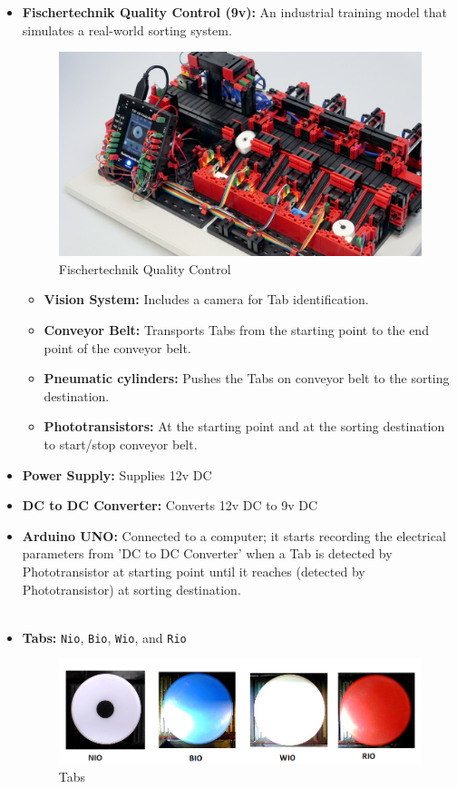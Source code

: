 \documentclass{article}
\begin{document}
\begin{itemize}
  \item \textbf{Fischertechnik Quality Control (9v):} An industrial training model that simulates a real-world sorting system.
    \begin{figure}[h]
        \centering
        \includegraphics[width=0.4\linewidth]{quality_control.jpeg}
        \caption{Fischertechnik Quality Control}
        \label{fig:labels}
    \end{figure}



  
    \begin{itemize}
          \item \textbf{Vision System:} Includes a camera for Tab identification.
          \item \textbf{Conveyor Belt:} Transports Tabs from the starting point to the end point of the conveyor belt.
          \item \textbf{Pneumatic cylinders:} Pushes the Tabs on conveyor belt to the sorting destination.
          \item \textbf{Phototransistors:} At the starting point and at the sorting destination to start/stop conveyor belt.
    \end{itemize}
  \item \textbf{Power Supply:} Supplies 12v DC
  \item \textbf{DC to DC Converter:} Converts 12v DC to 9v DC
  \item \textbf{Arduino UNO:} Connected to a computer; it starts recording the electrical parameters from 'DC to DC Converter' when a Tab is detected by Phototransistor at starting point until it reaches (detected by Phototransistor) at sorting destination.
  \\
  \vspace{0.8cm}
  \\
  \item \textbf{Tabs:} \texttt{Nio}, \texttt{Bio}, \texttt{Wio}, and \texttt{Rio}
    \begin{figure}[h]
        \centering
        \includegraphics[width=1\linewidth]{objects.png}
        \caption{Tabs}
        \label{fig:labels}
    \end{figure}

\end{itemize}
\end{document}
